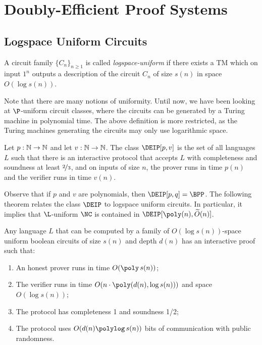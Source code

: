 \newcommand{\F}{\mathbb{F}}
\newcommand{\fH}{\mathbb{H}}

\chapter{Doubly-Efficient Proof Systems}
\label{lec:09}

\section{Logspace Uniform Circuits}

\begin{definition}\label{def:logspaceuniform}
  A circuit family $\{C_n\}_{n \geq 1}$ is called \emph{logspace-uniform} if
  there exists a TM which on input $1^n$ outputs a description of the circuit
  $C_n$ of size $s(n)$ in space $O(\log s(n))$.
\end{definition}

Note that there are many notions of uniformity. Until now, we have been
looking at $\P$-uniform circuit classes, where the circuits can be generated by
a Turing machine in polynomial time. The above definition is more restricted,
as the Turing machines generating the circuits may only use
logarithmic space.

\begin{definition}
  Let $p : \mathbb{N} \to \mathbb{N}$ and let $v : \mathbb{N} \to \mathbb{N}$. The class $\DEIP[p, v]$ is the
  set of all languages $L$ such that there is an interactive protocol that
  accepts $L$ with completeness and soundness at least $\nicefrac{2}{3}$, and on inputs
  of size $n$, the prover runs in time $p(n)$ and the verifier runs in time
  $v(n)$.
\end{definition}

Observe that if $p$ and $v$ are polynomials, then $\DEIP[p, q] = \BPP$. The
following theorem relates the class $\DEIP$ to logspace uniform circuits. In
particular, it implies that $\L$-uniform $\NC$ is contained in $\DEIP[\poly(n),
\widetilde{O}(n)]$.

\begin{theorem}\label{thm:main}
  Any language $L$ that can be computed by a family of $O(\log s(n))$-space
  uniform boolean circuits of size $s(n)$ and depth $d(n)$ has an interactive
  proof such that:
	\begin{enumerate}
		\item An honest prover runs in time $O(\poly\,{s(n)})$;
		\item The verifier runs in time $O(n \cdot \poly(d(n), \log s(n)))$ and space $O(\log s(n))$;
		\item The protocol has completeness 1 and soundness 1/2;
    \item The protocol uses $O(d(n)\polylog\,{s(n)})$ bits of communication with
      public randomness.
  \end{enumerate}
\end{theorem}

